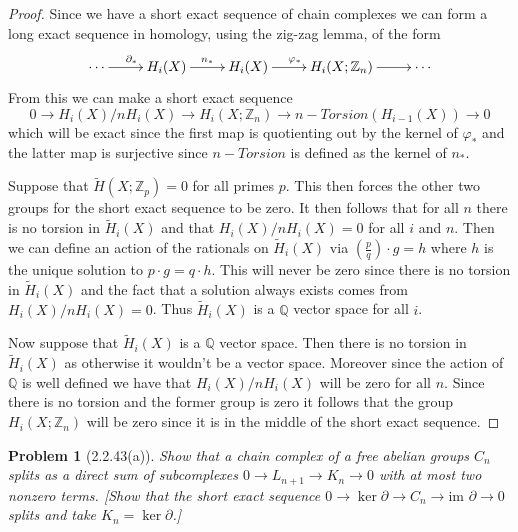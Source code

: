 \documentclass[10pt]{article}
\newcommand{\sk}{\vskip 10mm}
\newcommand{\bb}[1]{\mathbb{#1}}
\newcommand{\rH}{\widetilde{H}}
\theoremstyle{plain}
\newtheorem{problem}{Problem}
\theoremstyle{remark}
\begin{document}
\begin{proof}
  Since we have a short exact sequence of chain complexes we can form
  a long exact sequence in homology, using the zig-zag lemma, of the form
  \[
    \xymatrix{
      \cdots \ar[r]^{\partial_*} & H_i(X) \ar[r]^{n_*} & H_i(X) \ar[r]^{\varphi_*} & H_i(X;\bb{Z}_n) \ar[r] & \cdots
    }
  \]
  From this we can make a short exact sequence
  \[
    0\rightarrow H_i(X)/nH_i(X)\rightarrow H_i(X;\bb{Z}_n)\rightarrow n-Torsion(H_{i-1}(X))\rightarrow 0
  \]
  which will be exact since the first map is quotienting out by the kernel of $\varphi_*$ and
  the latter map is surjective since $n-Torsion$ is defined as the kernel of $n_*$.

  Suppose that $\rH(X;\bb{Z}_p)=0$ for all primes $p$. This then forces the other two groups
  for the short exact sequence to be zero. It then follows that for all $n$ there is no
  torsion in $\rH_i(X)$ and that $H_i(X)/nH_i(X)=0$ for all $i$ and $n$. Then we can define
  an action of the rationals on $\rH_i(X)$ via $(\frac{p}{q})\cdot g=h$ where $h$ is the unique
  solution to $p\cdot g = q\cdot h$. This will never be zero since there is no torsion in $\rH_i(X)$
  and the fact that a solution always exists comes from $H_i(X)/nH_i(X)=0$. Thus $\rH_i(X)$ is
  a $\bb{Q}$ vector space for all $i$.
  
  Now suppose that $\rH_i(X)$ is a $\bb{Q}$ vector space. Then there is no torsion in
  $\rH_i(X)$ as otherwise it wouldn't be a vector space. Moreover since the action of $\bb{Q}$ is
  well defined we have that $H_i(X)/nH_i(X)$ will be zero for all $n$. Since there is no torsion
  and the former group is zero it follows that the group $H_i(X;\bb{Z}_n)$ will be zero
  since it is in the middle of the short exact sequence. 
\end{proof}

\sk

\begin{problem}[2.2.43(a)]
  Show that a chain complex of a free abelian groups $C_n$ splits as a
  direct sum of subcomplexes $0\rightarrow L_{n+1}\rightarrow K_n\rightarrow 0$
  with at most two nonzero terms. [Show that the short exact sequence
  $0\rightarrow\ker\partial\rightarrow C_n\rightarrow\text{im\ }\partial\rightarrow 0$
  splits and take $K_n=\ker\partial$.]
\end{problem}
\end{document}
